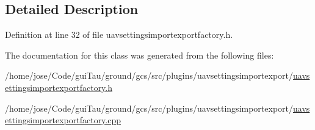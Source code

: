 \subsection{Detailed Description}


Definition at line 32 of file uavsettingsimportexportfactory.\-h.



The documentation for this class was generated from the following files\-:\begin{DoxyCompactItemize}
\item 
/home/jose/\-Code/gui\-Tau/ground/gcs/src/plugins/uavsettingsimportexport/\hyperlink{uavsettingsimportexportfactory_8h}{uavsettingsimportexportfactory.\-h}\item 
/home/jose/\-Code/gui\-Tau/ground/gcs/src/plugins/uavsettingsimportexport/\hyperlink{uavsettingsimportexportfactory_8cpp}{uavsettingsimportexportfactory.\-cpp}\end{DoxyCompactItemize}
